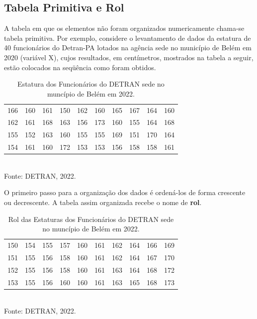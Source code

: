 \subsection{Tabela Primitiva e Rol}


\inic A tabela em que os elementos não foram organizados numericamente chama-se tabela primitiva. Por exemplo, considere o levantamento de dados da estatura de 40 funcionários do Detran-PA lotados na agência sede no município de Belém em 2020 (variável X), cujos resultados, em centímetros, mostrados na tabela a seguir, estão colocados na seqüência como foram obtidos.


\begin{table}[!htb]
    \centering
    {
    \caption{Estatura dos Funcionários do DETRAN sede no muncípio de Belém em 2022.}
    \label{estatura}
    \vspace{0.2cm}
\begin{tabular}{c|c|c|c|c|c|c|c|c|c}
  \hline\hline
  166 & 160 & 161 & 150 & 162 & 160 & 165 & 167 & 164 & 160 \\
  162 & 161 & 168 & 163 & 156 & 173 & 160 & 155 & 164 & 168 \\
  155 & 152 & 163 & 160 & 155 & 155 & 169 & 151 & 170 & 164 \\
  154 & 161 & 160 & 172 & 153 & 153 & 156 & 158 & 158 & 161 \\
  \hline\hline
\end{tabular}}
\\
\hspace{-5.5cm} Fonte: DETRAN, 2022.
\end{table}

\newpage

O primeiro passo para a organização dos dados é ordená-los de forma crescente ou decrescente. A tabela assim organizada recebe o nome de \textbf{rol}.


\begin{table}[!htb]
    \centering
    {
    \caption{Rol das Estaturas dos Funcionários do DETRAN sede no muncípio de Belém em 2022.}
    \label{estatura2}
    \vspace{0.2cm}
\begin{tabular}{c|c|c|c|c|c|c|c|c|c}
  \hline\hline
  150 & 154 & 155 & 157 & 160 & 161 & 162 & 164 & 166 & 169 \\
  151 & 155 & 156 & 158 & 160 & 161 & 162 & 164 & 167 & 170 \\
  152 & 155 & 156 & 158 & 160 & 161 & 163 & 164 & 168 & 172 \\
  153 & 155 & 156 & 160 & 160 & 161 & 163 & 165 & 168 & 173 \\
  \hline\hline
\end{tabular}}
\\
\hspace{-6.0cm} Fonte: DETRAN, 2022.
\end{table}



